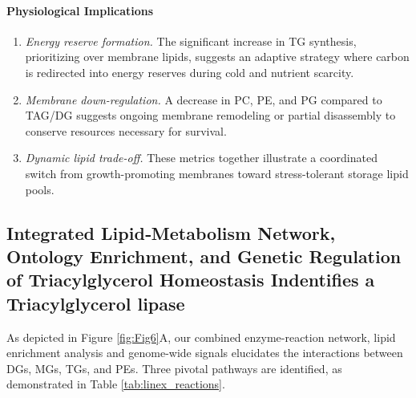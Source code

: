 \documentclass[10pt,letterpaper]{article}
\begin{document}
\paragraph{Physiological Implications}
\begin{enumerate}
  \item \textit{Energy reserve formation.}  The significant increase in TG synthesis, prioritizing over membrane lipids, suggests an adaptive strategy where carbon is redirected into energy reserves during cold and nutrient scarcity.
  \item \textit{Membrane down-regulation.}  A decrease in PC, PE, and PG compared to TAG/DG suggests ongoing membrane remodeling or partial disassembly to conserve resources necessary for survival.
  \item \textit{Dynamic lipid trade-off.}  These metrics together illustrate a coordinated switch from growth-promoting membranes toward stress-tolerant storage lipid pools.
\end{enumerate}


\subsection*{Integrated Lipid‐Metabolism Network, Ontology Enrichment, and Genetic Regulation of Triacylglycerol Homeostasis Indentifies a Triacylglycerol lipase}

As depicted in Figure \ref{fig:Fig6}A, our combined enzyme-reaction network, lipid enrichment analysis and genome-wide signals elucidates the interactions between DGs, MGs, TGs, and PEs. Three pivotal pathways are identified, as demonstrated in Table \ref{tab:linex_reactions}.
\end{document}
